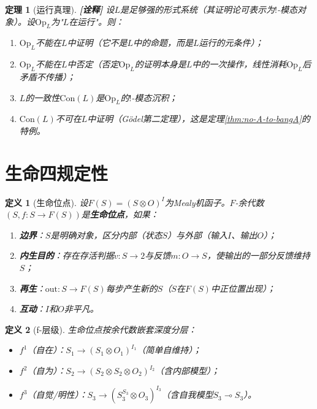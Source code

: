 \documentclass[11pt,a4paper]{article}
\newtheorem{definition}{定义}
\newtheorem{theorem}{定理}
\newcommand{\lvl}[1]{\hfill\textbf{\footnotesize[#1]}}
\newcommand{\lvI}{\lvl{诠释}}
\newcommand{\lolli}{\multimap}
\newcommand{\bang}{{!}}
\newcommand{\tensor}{\otimes}
\begin{document}
\begin{theorem}[运行真理]\label{thm:operational-truth}\lvI
设$L$是足够强的形式系统（其证明论可表示为$\bang$-模态对象）。设$\mathrm{Op}_L$为"$L$在运行"。则：
\begin{enumerate}
  \item $\mathrm{Op}_L$不能在$L$中证明（它不是$L$中的命题，而是$L$运行的元条件）；
  \item $\mathrm{Op}_L$不能在$L$中否定（否定$\mathrm{Op}_L$的证明本身是$L$中的一次操作，线性消耗$\mathrm{Op}_L$后矛盾不传播）；
  \item $L$的一致性$\mathrm{Con}(L)$是$\mathrm{Op}_L$的$\bang$-模态沉积；
  \item $\mathrm{Con}(L)$不可在$L$中证明（G\"odel第二定理），这是定理\ref{thm:no-A-to-bangA}的特例。
\end{enumerate}
\end{theorem}

\section{生命四规定性}

\begin{definition}[生命位点]\label{def:life-site}
设$F(S)=(S\tensor O)^I$为Mealy机函子。$F$-余代数$(S,f:S\to F(S))$是\textbf{生命位点}，如果：
\begin{enumerate}
  \item \textbf{边界}：$S$是明确对象，区分内部（状态$S$）与外部（输入$I$、输出$O$）；
  \item \textbf{内生目的}：存在存活判据$v:S\to 2$与反馈$m:O\to S$，使输出的一部分反馈维持$S$；
  \item \textbf{再生}：$\mathrm{out}:S\to F(S)$每步产生新的$S$（$S$在$F(S)$中正位置出现）；
  \item \textbf{互动}：$I$和$O$非平凡。
\end{enumerate}
\end{definition}

\begin{definition}[f-层级]\label{def:f-levels}
生命位点按余代数嵌套深度分层：
\begin{itemize}
  \item $f^1$（自在）：$S_1\to(S_1\tensor O_1)^{I_1}$（简单自维持）；
  \item $f^2$（自为）：$S_2\to(S_2\tensor S_2\tensor O_2)^{I_2}$（含内部模型）；
  \item $f^3$（自觉/明性）：$S_3\to(S_3^{S_3}\tensor O_3)^{I_3}$（含自我模型$S_3\lolli S_3$）。
\end{itemize}
\end{definition}
\end{document}
